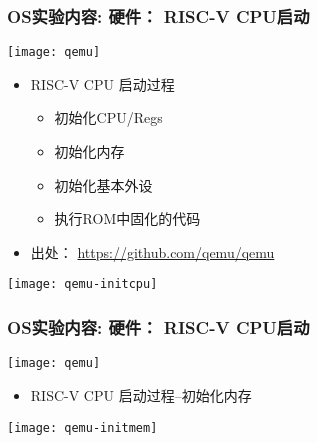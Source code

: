 \begin{frame}
    \frametitle{OS实验内容: 硬件： RISC-V CPU启动}
    \centering
    \texttt{[image: qemu]}	
    \begin{itemize}
        
        \item RISC-V CPU 启动过程
        \begin{itemize}
            \item 初始化CPU/Regs	
            \item 初始化内存
            \item 初始化基本外设
            \item 执行ROM中固化的代码
        \end{itemize}
        \item 出处： \href{https://github.com/qemu/qemu}{https://github.com/qemu/qemu}
        
    \end{itemize}	
    
\end{frame}

\begin{frame}[plain]
    \centering
    \texttt{[image: qemu-initcpu]}
\end{frame}

\begin{frame}
    \frametitle{OS实验内容: 硬件： RISC-V CPU启动}
    \texttt{[image: qemu]}	
    \begin{itemize}
        
        \item RISC-V CPU 启动过程--初始化内存
        
    \end{itemize}	
    
    \centering
    \texttt{[image: qemu-initmem]}
\end{frame}


